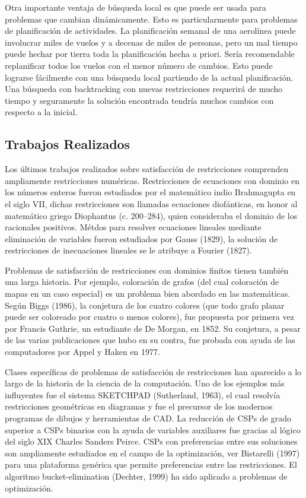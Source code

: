 Otra importante ventaja de b\'usqueda local es que puede ser usada para problemas que cambian din\'amicamente. Esto es particularmente para problemas de planificaci\'on de actividades. La planificaci\'on semanal de una aerol\'inea puede involucrar miles de vuelos y a decenas de miles de personas, pero un mal tiempo puede hechar por tierra toda la planificaci\'on hecha a priori. Ser\'ia recomendable replanificar todos los vuelos con el menor n\'umero de cambios. Esto puede lograrse f\'acilmente con una b\'usqueda local partiendo de la actual planificaci\'on. Una b\'usqueda con backtracking con nuevas restricciones requerir\'a de mucho tiempo y seguramente la soluci\'on encontrada tendr\'ia muchos cambios con respecto a la inicial.

\subsection{Trabajos Realizados}

Los \'ultimos trabajos realizados sobre satisfacci\'on de restricciones comprenden ampliamente restricciones num\'ericas. Restricciones de ecuaciones con dominio en los n\'umeros enteros fueron estudiados por el matem\'atico indio Brahmagupta en el siglo VII, dichas restricciones son llamadas ecuaciones diofánticas, en honor al matem\'atico griego Diophantus (c. 200–284), quien consideraba el dominio de los racionales positivos. M\'etdos para resolver ecuaciones lineales  mediante eliminaci\'on de variables fueron estudiados por Gauss (1829), la soluci\'on de restricciones de inecuaciones lineales se le atribuye a Fourier (1827).

Problemas de satisfacci\'on de restricciones con dominios finitos tienen tambi\'en una larga historia. Por ejemplo, coloraci\'on de grafos (del cual coloraci\'on de mapas en un caso especial) es un problema bien abordado en las matem\'aticas. Seg\'un Biggs (1986), la conjetura de los cuatro colores (que todo grafo planar puede ser coloreado por cuatro o menos colores), fue propuesta por primera vez por Francis Guthrie, un estudiante de De Morgan, en 1852. Su conjetura, a pesar de las varias publicaciones que hubo en su contra, fue probada con ayuda de las computadores por Appel y Haken en 1977.

Clases espec\'ificas de problemas de satisfacci\'on de restricciones han aparecido a lo largo de la historia de la ciencia de la computaci\'on. Uno de los ejemplos m\'as influyentes fue el sistema SKETCHPAD (Sutherland, 1963), el cual resolv\'ia restricciones geom\'etricas en diagramas y fue el precursor de los modernos programas de dibujos y herramientas de CAD. La reducci\'on de CSPs de grado superior a CSPs binarios con la ayuda de variables auxiliares fue gracias al l\'ogico del siglo XIX Charles Sanders Peirce. CSPs con preferencias entre sus soluciones son ampliamente estudiados en el campo de la optimizaci\'on, ver Bistarelli (1997) para una plataforma gen\'erica que permite preferencias entre las restricciones. El algoritmo bucket-elimination (Dechter, 1999) ha sido aplicado a problemas de optimizaci\'on.

